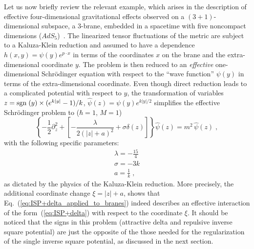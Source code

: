 \documentclass[a4paper,preprint,draft,showpacs,amsmath,amsfonts,amssymb,aps,prd]{revtex4}%
\begin{document}
Let us now briefly review the relevant example,
which arises in the description of
effective four-dimensional 
gravitational effects observed on a $(3 + 1)$-dimensional 
subspace, a 
3-brane,
embedded in a spacetime
with five noncompact dimensions ($AdS_{5}$)~\cite{Randall-Sundrum}.
The
linearized tensor fluctuations of the metric 
are subject to a Kaluza-Klein reduction
and assumed to have a dependence $h(x,y) = \psi (y) e^{p \cdot x}$
in terms of the coordinates $x$ on the brane
and the extra-dimensional coordinate $y$.
The problem is then reduced to an {\em effective\/} one-dimensional
Schr\"{o}dinger equation with respect to the 
``wave function'' $\psi (y)$ in terms of the extra-dimensional coordinate.
 Even though
 direct reduction leads to a complicated potential with respect to $y$,
the transformation of variables
 $z=  {\rm sgn} \;  (y) \times (e^{k|y|} -1)/k$,
$\hat{\psi} (z) = \psi (y) e^{k|y|/2}$
simplifies the effective 
Schr\"{o}dinger problem to
($\hbar=1$, $M=1$)
\begin{equation}
\left\{
-\frac{1}{2} \partial^{2}_{z} +
\left[
 - \frac{\lambda}{ 2 (|z| + a)^{2}}
+ \sigma \delta (z)
\right]
\right\}
\hat{\psi} (z)
=
m^{2}
\, \hat{\psi} (z)
\; ,
\label{eq:ISP+delta_applied_to_branes}
\end{equation}
with the following specific parameters:
\begin{eqnarray}
\lambda = - \frac{15}{4}
\nonumber \\
\sigma =- 3k
\nonumber \\
a= \frac{1}{k}
\; ,
\label{eq:brane_parameters}
\end{eqnarray}
as dictated by the physics of the Kaluza-Klein reduction.
More precisely,
the additional coordinate change 
$\xi = |z| + a$, shows that
Eq.~(\ref{eq:ISP+delta_applied_to_branes}) indeed 
describes an effective interaction of the form~(\ref{eq:ISP+delta})
with respect to the coordinate $\xi$.
It should be noticed 
that the signs
in this problem (attractive delta and repulsive inverse square potential)
are just the opposite of the 
those needed for the regularization of the single inverse square potential, 
as discussed in the next section.
\end{document}
